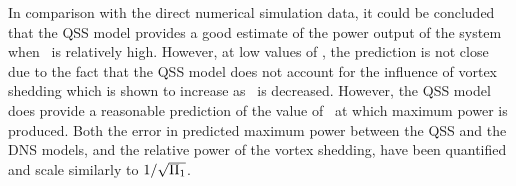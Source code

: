 In comparison with the direct numerical simulation data, it could be concluded that the QSS model provides a good estimate of the power output of the system when \massstiff\ is relatively high. However, at low values of \massstiff, the prediction is not close due to the fact that the QSS model does not account for the influence of vortex shedding which is shown to increase as \massstiff\ is decreased. However, the QSS model does provide a reasonable prediction of the value of \massdamp\ at which maximum power is produced. Both the error in predicted maximum power between the QSS and the DNS models, and the relative power of the vortex shedding, have been quantified and scale similarly to $1/\sqrt{\Pi_1}$.

 









